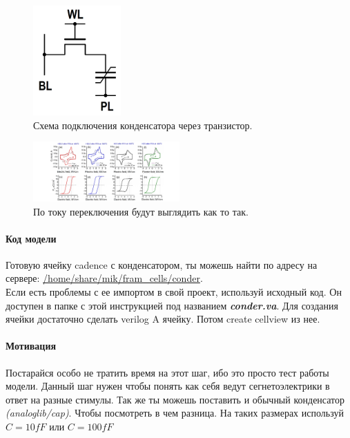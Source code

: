 \documentclass[a4paper,12pt]{article} %
\begin{document}
\begin{figure}[h]
\centering
\includegraphics[width=0.3\textwidth]{FRAM-fig1.PNG}
\caption{Схема подключения конденсатора через транзистор.}
\end{figure}



\begin{figure}[h]
\centering
\includegraphics[width=0.5\textwidth]{segneto-graph.png}
\caption{По току переключения будут выглядить как то так.}
\end{figure}


\paragraph{Код модели}

Готовую ячейку cadence с конденсатором, ты можешь найти по адресу на сервере: \url{/home/share/mik/fram_cells/conder}.\\
Если есть проблемы с ее импортом в свой проект, используй исходный код. Он доступен в папке с этой инструкцией под названием \textbf{\textit{conder.va}}. Для создания ячейки достаточно сделать verilog A ячейку. Потом create cellview из нее.

\paragraph{Мотивация}

Постарайся особо не тратить время на этот шаг, ибо это просто тест работы модели. Данный шаг нужен чтобы понять как себя ведут сегнетоэлектрики в ответ на разные стимулы. Так же ты можешь поставить и обычный конденсатор \textit{(analoglib/cap)}. Чтобы посмотреть в чем разница. На таких размерах используй $C=10fF$ или $C=100fF$ 
\end{document}
